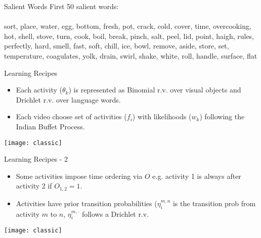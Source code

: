\begin{frame}{Salient Words}
First 50 salient words:
\\ \vspace{1cm} \\
sort, place, water, egg, bottom, fresh, pot, crack, cold, cover, time, overcooking, hot, shell, stove, turn, cook, boil, break, pinch, salt, peel, lid, point, haigh, rules, perfectly, hard, smell, fast, soft, chill, ice, bowl, remove, aside, store, set, temperature, coagulates, yolk, drain, swirl, shake, white, roll, handle, surface, flat
\end{frame}



\begin{frame}{Learning Recipes}
\begin{itemize}
  \item Each activity ($\theta_k$) is represented as Binomial r.v. over visual objects and Drichlet r.v. over language words.
  \item Each video choose set of activities ($f_i$) with likelihoods ($w_k$) following the Indian Buffet Process.
  \end{itemize}

\begin{center} \texttt{[image: classic]} \end{center}
\end{frame}

\begin{frame}{Learning Recipes - 2}
\begin{itemize}
  \item Some activities impose time ordering via $O$ e.g. activity 1 is always after activity 2 if $O_{1,2}=1$.
  \item Activities have prior transition probabilities ($\eta_i^{m,n}$ is the transition prob from activity $m$ to $n$, $\eta_i^{m,\cdot}$ follows a Drichlet r.v.
  \end{itemize}

\begin{center} \texttt{[image: classic]} \end{center}
\end{frame}



